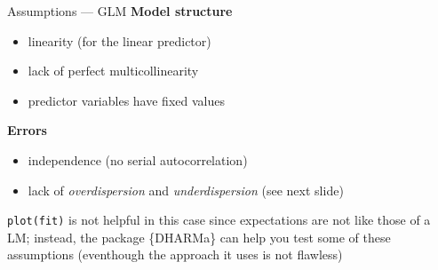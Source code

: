 \documentclass[
  10pt,
  ignorenonframetext,
  aspectratio=169,
  t]{beamer}
\providecommand{\tightlist}{%
  \setlength{\itemsep}{0pt}\setlength{\parskip}{0pt}}
\newcommand{\blueit}[1]{\textcolor{bluebeamer}{\emph{#1}}}
\newcommand{\bluebold}[1]{\textcolor{bluebeamer}{\textbf{#1}}}
\let\oldtexttt\texttt
\renewcommand{\texttt}[1]{\colorbox{gray!20}{\oldtexttt{#1}}}
\begin{document}
\begin{frame}[fragile]{Assumptions --- GLM}
\protect{}\label{assumptions-glm}
\bluebold{Model structure}

\begin{itemize}
\tightlist
\item
  linearity (for the linear predictor)
\item
  lack of perfect multicollinearity
\item
  predictor variables have fixed values
\end{itemize}

\bluebold{Errors}

\begin{itemize}
\tightlist
\item
  independence (no serial autocorrelation)
\item
  lack of \blueit{overdispersion} and \blueit{underdispersion} (see next
  slide)
\end{itemize}

\texttt{plot(fit)} is not helpful in this case since expectations are
not like those of a LM; instead, the package \{DHARMa\} can help you
test some of these assumptions (eventhough the approach it uses is not
flawless)
\end{frame}
\end{document}
